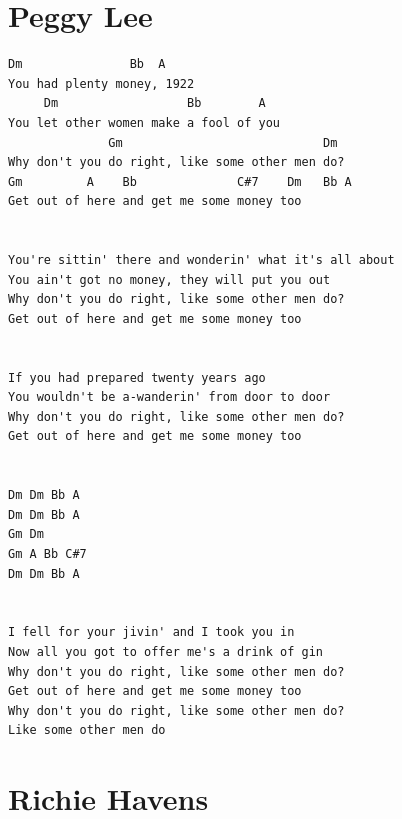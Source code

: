 \documentclass[a4paper]{article}
\begin{document}
\section{Peggy Lee} %
\label{sec:Peggy Lee}
\begin{Verbatim}[commandchars=\\\{\}]
Dm               Bb  A
You had plenty money, 1922 
     Dm                  Bb        A
You let other women make a fool of you 
              Gm                            Dm
Why don't you do right, like some other men do? 
Gm         A    Bb              C#7    Dm   Bb A
Get out of here and get me some money too 


You're sittin' there and wonderin' what it's all about 
You ain't got no money, they will put you out 
Why don't you do right, like some other men do? 
Get out of here and get me some money too 


If you had prepared twenty years ago 
You wouldn't be a-wanderin' from door to door 
Why don't you do right, like some other men do? 
Get out of here and get me some money too 


Dm Dm Bb A 
Dm Dm Bb A 
Gm Dm 
Gm A Bb C#7 
Dm Dm Bb A


I fell for your jivin' and I took you in 
Now all you got to offer me's a drink of gin 
Why don't you do right, like some other men do? 
Get out of here and get me some money too 
Why don't you do right, like some other men do? 
Like some other men do
\end{Verbatim}
\newpage
\section{Richie Havens} %
\label{sec:Richie Havens}
\end{document}
